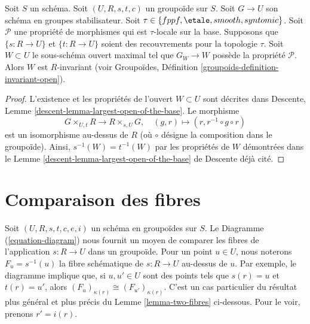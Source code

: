 \begin{lemma}
\label{lemma-property-G-invariant}
Soit $S$ un schéma.
Soit $(U, R, s, t, c)$ un groupoïde sur $S$.
Soit $G \to U$ son schéma en groupes stabilisateur.
Soit $\tau \in \{fppf, \linebreak[0] \etale, \linebreak[0]
smooth, \linebreak[0] syntomic\}$.
Soit $\mathcal{P}$ une propriété de morphismes qui est $\tau$-locale
sur la base. Supposons que $\{s : R \to U\}$ et $\{t : R \to U\}$ soient des recouvrements
pour la topologie $\tau$. Soit $W \subset U$ le sous-schéma ouvert maximal
tel que $G_W \to W$ possède la propriété $\mathcal{P}$. Alors $W$ est $R$-invariant
(voir
Groupoïdes, Définition
\ref{groupoids-definition-invariant-open}).
\end{lemma}

\begin{proof}
L'existence et les propriétés de l'ouvert $W \subset U$ sont décrites dans
Descente, Lemme \ref{descent-lemma-largest-open-of-the-base}.
Le morphisme
$$
G \times_{U, t} R \longrightarrow R \times_{s, U} G, \quad
(g, r) \longmapsto (r, r^{-1} \circ g \circ r)
$$
est un isomorphisme au-dessus de $R$ (où $\circ$ désigne
la composition dans le groupoïde). Ainsi, $s^{-1}(W) = t^{-1}(W)$ par les
propriétés de $W$ démontrées dans le
Lemme \ref{descent-lemma-largest-open-of-the-base} de Descente déjà cité.
\end{proof}



\section{Comparaison des fibres}
\label{section-fibres}

\noindent
Soit $(U, R, s, t, c, e, i)$ un schéma en groupoïdes sur $S$.
Le Diagramme (\ref{equation-diagram})
nous fournit un moyen de comparer les fibres de l'application $s : R \to U$ dans un groupoïde.
Pour un point $u \in U$, nous noterons $F_u = s^{-1}(u)$ la fibre
schématique de $s : R \to U$ au-dessus de $u$. Par exemple, le diagramme
implique que, si $u, u' \in U$ sont des points tels
que $s(r) = u$ et $t(r) = u'$, alors
$(F_u)_{\kappa(r)} \cong (F_{u'})_{\kappa(r)}$.
C'est un cas particulier du résultat plus général et plus précis du
Lemme \ref{lemma-two-fibres}
ci-dessous. Pour le voir, prenons $r' = i(r)$.

